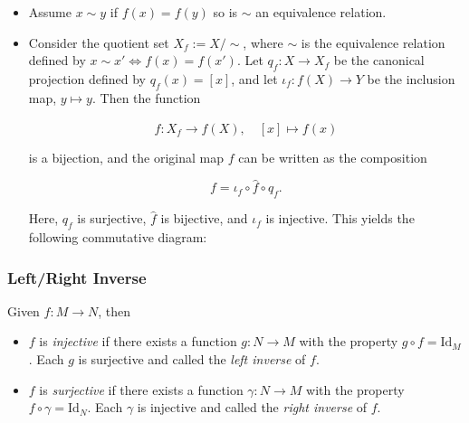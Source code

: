\begin{itemize}

	\item Assume \(x \sim y \) if \(f(x)= f(y)\) so is \(\sim\) an equivalence relation.

	\item Consider the quotient set \( X_f := X/\sim \), where \( \sim \) is the equivalence relation 
	      defined by \( x \sim x' \iff f(x) = f(x') \). Let \( q_f : X \to X_f \) be the canonical 
		  projection defined by \( q_f(x) = [x] \), and let \( \iota_f : f(X) \to Y \) be the inclusion  
		  map, \( y \mapsto y \). Then the function
	      
		  \[
		      \hat{f} : X_f \to f(X), \quad [x] \mapsto f(x)
	      \]
	  
		  is a bijection, and the original map \(f\) can be written as the composition
	 
		  \[
		      f = \iota_f \circ \hat{f} \circ q_f.
	      \]
	 
		  Here, \( q_f \) is surjective, \( \hat{f} \) is bijective, and \( \iota_f \) is injective. 
		  This yields the following commutative diagram:
	      
		  \begin{center}
	      \end{center}

\end{itemize}

\subsubsection{Left/Right Inverse}

Given \(f : M \to N\), then  

\begin{itemize}
	
	\item \(f\) is \emph{injective} if there exists a function \(g: N \to M\) with the property \(g \circ f = \text{Id}_M\). Each 
		\(g\) is surjective and called the \emph{left inverse} of \(f\).


	\item \(f\) is \emph{surjective} if there exists a function \(\gamma: N \to M\) with the property \(f \circ \gamma = \text{Id}_N\). Each 
		\(\gamma\) is injective and called the \emph{right inverse} of \(f\).
	
\end{itemize}

